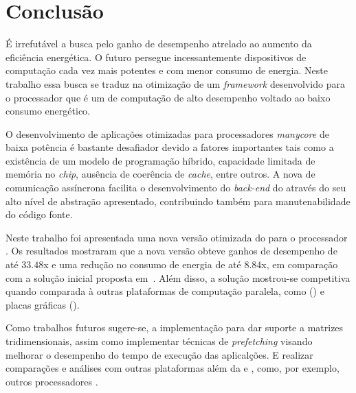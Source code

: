 %

\chapter{Conclusão}
\label{cap:conclusao}

É irrefutável a busca pelo ganho de desempenho atrelado ao aumento da eficiência energética. O futuro persegue incessantemente dispositivos de computação cada vez mais potentes e com menor consumo de energia. Neste trabalho essa busca se traduz na otimização de um \textit{framework} desenvolvido para o processador \mppa que é um \chip de computação de alto desempenho voltado ao baixo consumo energético. 

O desenvolvimento de aplicações otimizadas para processadores \textit{manycore} de baixa potência é bastante desafiador devido a fatores importantes tais como a existência de um modelo de programação híbrido, capacidade limitada de memória no \textit{chip}, ausência de coerência de \textit{cache}, entre outros. A nova \api de comunicação assíncrona facilita o desenvolvimento do \textit{back-end} do \fw através do seu alto nível de abstração apresentado, contribuindo também para manutenabilidade do código fonte.

Neste trabalho foi apresentada uma nova versão otimizada do \fw \pskel para o processador \mppa. Os resultados mostraram que a nova versão obteve ganhos de desempenho de até $33.48$x e uma redução no consumo de energia de até $8.84$x, em comparação com a solução inicial proposta em~\cite{Podesta:TCC}. Além disso, a solução mostrou-se competitiva quando comparada à outras plataformas de computação paralela, como \multicore (\cpu) e placas gráficas (\gpu). 

Como trabalhos futuros sugere-se, a implementação para dar suporte a matrizes tridimensionais, assim como implementar técnicas de \textit{prefetching} visando melhorar o desempenho do tempo de execução das aplicalções. E realizar comparações e análises com outras plataformas além da \cpu e \gpu, como, por exemplo, outros processadores \manycore.